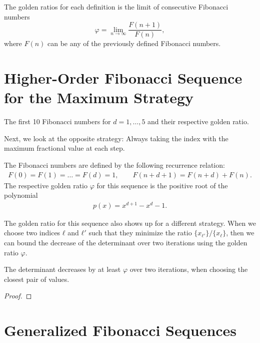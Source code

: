 The golden ratios for each definition is the limit of consecutive Fibonacci numbers
\[
  φ = \lim_{n → ∞} \frac{F(n + 1)}{F(n)},
\]
where $F(n)$ can be any of the previously defined Fibonacci numbers.

\section{Higher-Order Fibonacci Sequence for the Maximum Strategy}

\begin{table}[tbp]
  \caption{The first 10 Fibonacci numbers for $d = 1, …, 5$ and their respective golden ratio.}
  \label{tbl:max-fibonacci}
  \centering
  
\end{table}

Next, we look at the opposite strategy:
Always taking the index with the maximum fractional value at each step.

The Fibonacci numbers are defined by the following recurrence relation:
\begin{align*}
  F(0) = F(1) = \dots = F(d) = 1, \qquad F(n + d + 1) = F(n + d) + F(n).
\end{align*}
The respective golden ratio $φ$ for this sequence is the positive root of the polynomial
\begin{align*}
  p(x) = x^{d+1} - x^d - 1.
\end{align*}

The golden ratio for this sequence also shows up for a different strategy.
When we choose two indices $ℓ$ and $ℓ'$ such that they minimize the ratio
$\{x_{ℓ'}\}/\{x_{ℓ}\}$, then we can bound the decrease of the determinant over
two iterations using the golden ratio $φ$.

\begin{theorem}
  The determinant decreases by at least $φ$ over two iterations,
  when choosing the closest pair of values.
\end{theorem}

\begin{proof}

\end{proof}

\section{Generalized Fibonacci Sequences}

